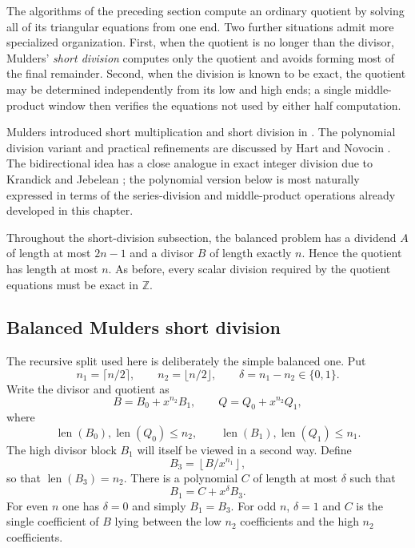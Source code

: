 \documentclass[11pt]{book}
\theoremstyle{definition}
\newcommand{\ZZ}{\mathbb Z}
\newcommand{\len}{\operatorname{len}}
\begin{document}
The algorithms of the preceding section compute an ordinary quotient by solving
all of its triangular equations from one end.  Two further situations admit
more specialized organization.  First, when the quotient is no longer than the
divisor, Mulders' \emph{short division} computes only the quotient and avoids
forming most of the final remainder.  Second, when the division is known to be
exact, the quotient may be determined independently from its low and high ends;
a single middle-product window then verifies the equations not used by either
half computation.

Mulders introduced short multiplication and short division in
\cite{Mulders2000}.  The polynomial division variant and practical refinements
are discussed by Hart and Novocin \cite{HartNovocin2011}.  The bidirectional
idea has a close analogue in exact integer division due to Krandick and
Jebelean \cite{KrandickJebelean1996}; the polynomial version below is most
naturally expressed in terms of the series-division and middle-product
operations already developed in this chapter.

Throughout the short-division subsection, the balanced problem has a dividend
$A$ of length at most $2n-1$ and a divisor $B$ of length exactly $n$.  Hence the
quotient has length at most $n$.  As before, every scalar division required by
the quotient equations must be exact in $\ZZ$.

\subsection{Balanced Mulders short division}

The recursive split used here is deliberately the simple balanced one.  Put
\[
 n_1=\lceil n/2\rceil,
 \qquad
 n_2=\lfloor n/2\rfloor,
 \qquad
 \delta=n_1-n_2\in\{0,1\}.
\]
Write the divisor and quotient as
\begin{equation}\label{eq:mulders-block-splits}
 B=B_0+x^{n_2}B_1,
 \qquad
 Q=Q_0+x^{n_2}Q_1,
\end{equation}
where
\[
 \len(B_0),\len(Q_0)\leq n_2,
 \qquad
 \len(B_1),\len(Q_1)\leq n_1.
\]
The high divisor block $B_1$ will itself be viewed in a second way.  Define
\[
 B_3=\left\lfloor B/x^{n_1}\right\rfloor,
\]
so that $\len(B_3)=n_2$.  There is a polynomial $C$ of length at most
$\delta$ such that
\begin{equation}\label{eq:mulders-b1-b3}
 B_1=C+x^\delta B_3.
\end{equation}
For even $n$ one has $\delta=0$ and simply $B_1=B_3$.  For odd $n$,
$\delta=1$ and $C$ is the single coefficient of $B$ lying between the low
$n_2$ coefficients and the high $n_2$ coefficients.
\end{document}
